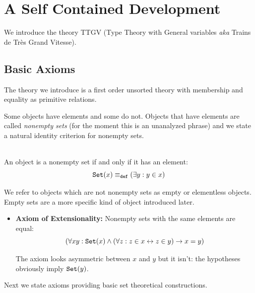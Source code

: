 \documentclass[12pt]{article}
\begin{document}
\section{A Self Contained Development}\label{selfcontained}

We introduce the theory TTGV (Type Theory with General variables {\sl aka} Trains de Tr\`es Grand Vitesse).
\subsection{Basic Axioms}



The theory we introduce is a first order unsorted theory with membership and equality as primitive relations.

Some objects have elements and some do not.  Objects that have elements are called {\em nonempty sets\/} (for the moment this is an unanalyzed phrase) and we state a natural identity criterion for nonempty sets.

\begin{dfn}\mbox{\negthinspace}\\
 An object is a nonempty set if and only if it has an element:  $${\tt Set}(x) \equiv_{\tt def} (\exists y:y \in x)$$\end{dfn}

We refer to objects which are not nonempty sets as empty or elementless objects.  Empty sets are a more specific kind of object introduced later.

\begin{itemize}
  
\item {\bf Axiom of Extensionality:}  Nonempty sets with the same elements are equal:  $$(\forall xy:{\tt Set}(x) \wedge(\forall z:z \in x \leftrightarrow z \in y) \rightarrow x=y)$$



\begin{footnotesize}The axiom looks asymmetric between $x$ and $y$ but it isn't:  the hypotheses obviously imply ${\tt Set}(y)$.\end{footnotesize}

\end{itemize}

Next we state axioms providing basic set theoretical constructions.
\end{document}

